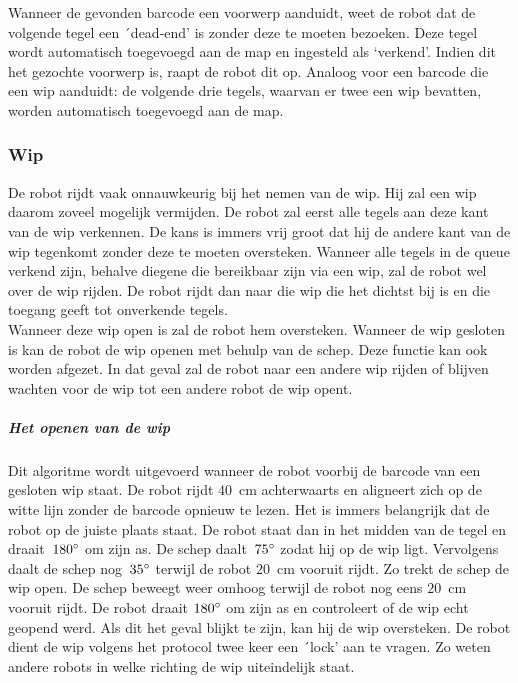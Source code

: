 \documentclass[tt3]{penoverslag}
\begin{document}

Wanneer de gevonden barcode een voorwerp aanduidt, weet de robot dat de volgende tegel een ´dead-end' is zonder deze te moeten bezoeken. Deze tegel wordt automatisch toegevoegd aan de map en ingesteld als `verkend'. Indien dit het gezochte voorwerp is, raapt de robot dit op.
Analoog voor een barcode die een wip aanduidt: de volgende drie tegels, waarvan er twee een wip bevatten, worden automatisch toegevoegd aan de map.

\subsubsection{Wip}
\label{ssec:AlgoWip}
De robot rijdt vaak onnauwkeurig bij het nemen van de wip. Hij zal een wip daarom zoveel mogelijk vermijden. De robot zal eerst alle tegels aan deze kant van de wip verkennen. De kans is immers vrij groot dat hij de andere kant van de wip tegenkomt zonder deze te moeten oversteken. Wanneer alle tegels in de queue verkend zijn, behalve diegene die bereikbaar zijn via een wip, zal de robot wel over de wip rijden. De robot rijdt dan naar die wip die het dichtst bij is en die toegang geeft tot onverkende tegels.\\

Wanneer deze wip open is zal de robot hem oversteken. Wanneer de wip gesloten is kan de robot de wip openen met behulp van de schep. Deze functie kan ook worden afgezet. In dat geval zal de robot naar een andere wip rijden of blijven wachten voor de wip tot een andere robot de wip opent.

\subparagraph{Het openen van de wip} 
Dit algoritme wordt uitgevoerd wanneer de robot voorbij de barcode van een gesloten wip staat. De robot rijdt $40$~cm achterwaarts en aligneert zich op de witte lijn zonder de barcode opnieuw te lezen. Het is immers belangrijk dat de robot op de juiste plaats staat. De robot staat dan in het midden van de tegel en draait~$180\degree$ om zijn as. De schep daalt~$75\degree$ zodat hij op de wip ligt. Vervolgens daalt de schep nog~$35\degree$ terwijl de robot $20$~cm vooruit rijdt. Zo trekt de schep de wip open. De schep beweegt weer omhoog terwijl de robot nog eens $20$~cm vooruit rijdt. De robot draait $180\degree$ om zijn as en controleert of de wip echt geopend werd. Als dit het geval blijkt te zijn, kan hij de wip oversteken. De robot dient de wip volgens het protocol twee keer een ´lock' aan te vragen. Zo weten andere robots in welke richting de wip uiteindelijk staat.
\end{document}
